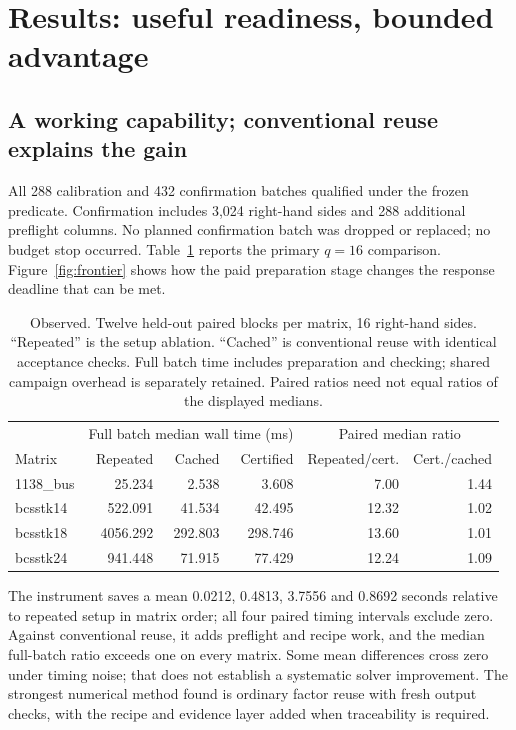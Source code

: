 \documentclass[11pt,a4paper]{article}
\newcommand{\obs}{\textsf{Observed}}
\begin{document}
\section{Results: useful readiness, bounded advantage}
\subsection{A working capability; conventional reuse explains the gain}
All 288 calibration and 432 confirmation batches qualified under the frozen predicate. Confirmation includes 3,024 right-hand sides and 288 additional preflight columns. No planned confirmation batch was dropped or replaced; no budget stop occurred. Table~\ref{tab:numerical} reports the primary $q=16$ comparison. Figure~\ref{fig:frontier} shows how the paid preparation stage changes the response deadline that can be met.

\begin{table}[ht]\centering\small
\begin{tabular*}{\linewidth}{@{\extracolsep{\fill}}lrrrrr@{}}\toprule
& \multicolumn{3}{c}{Full batch median wall time (ms)} & \multicolumn{2}{c}{Paired median ratio}\\
Matrix & Repeated & Cached & Certified & Repeated/cert. & Cert./cached\\\midrule
1138\_bus & 25.234 & 2.538 & 3.608 & 7.00 & 1.44\\
bcsstk14 & 522.091 & 41.534 & 42.495 & 12.32 & 1.02\\
bcsstk18 & 4056.292 & 292.803 & 298.746 & 13.60 & 1.01\\
bcsstk24 & 941.448 & 71.915 & 77.429 & 12.24 & 1.09\\
\bottomrule\end{tabular*}
\caption{\obs{}. Twelve held-out paired blocks per matrix, 16 right-hand sides. ``Repeated'' is the setup ablation. ``Cached'' is conventional reuse with identical acceptance checks. Full batch time includes preparation and checking; shared campaign overhead is separately retained. Paired ratios need not equal ratios of the displayed medians.}
\label{tab:numerical}\end{table}

The instrument saves a mean 0.0212, 0.4813, 3.7556 and 0.8692 seconds relative to repeated setup in matrix order; all four paired timing intervals exclude zero. Against conventional reuse, it adds preflight and recipe work, and the median full-batch ratio exceeds one on every matrix. Some mean differences cross zero under timing noise; that does not establish a systematic solver improvement. The strongest numerical method found is ordinary factor reuse with fresh output checks, with the recipe and evidence layer added when traceability is required.
\end{document}
